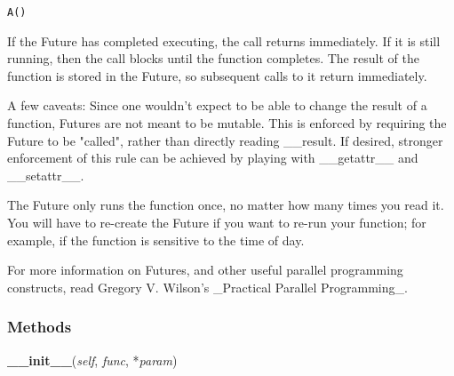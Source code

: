 \begin{alltt}
\pysrcprompt{{\textgreater}{\textgreater}{\textgreater} } A()\end{alltt}
If the Future has completed executing, the call returns immediately. If it 
is still running, then the call blocks until the function completes. The 
result of the function is stored in the Future, so subsequent calls to it 
return immediately.

A few caveats: Since one wouldn't expect to be able to change the result of
a function, Futures are not meant to be mutable. This is enforced by 
requiring the Future to be "called", rather than directly reading 
\_\_result. If desired, stronger enforcement of this rule can be achieved 
by playing with \_\_getattr\_\_ and \_\_setattr\_\_.

The Future only runs the function once, no matter how many times you read 
it. You will have to re-create the Future if you want to re-run your 
function; for example, if the function is sensitive to the time of day.

For more information on Futures, and other useful parallel programming 
constructs, read Gregory V. Wilson's \_Practical Parallel Programming\_.



  \subsubsection{Methods}

    \label{epigrass:Future:__init__}

    \vspace{0.5ex}

    \begin{boxedminipage}{\textwidth}

    \raggedright \textbf{\_\_init\_\_}(\textit{self}, \textit{func}, *\textit{param})

    \end{boxedminipage}

    \label{epigrass:Future:__repr__}

